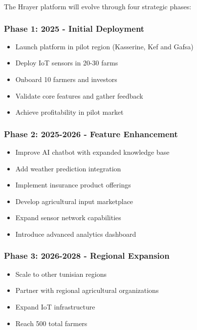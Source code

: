 \documentclass[9pt,twocolumn,twoside]{article}
\begin{document}
The Hrayer platform will evolve through four strategic phases:

\subsubsection{Phase 1: 2025 - Initial Deployment}

\begin{itemize}
  \item Launch platform in pilot region (Kasserine, Kef and Gafsa)
  \item Deploy IoT sensors in 20-30 farms
  \item Onboard 10 farmers and investors
  \item Validate core features and gather feedback
  \item Achieve profitability in pilot market
\end{itemize}

\subsubsection{Phase 2: 2025-2026 - Feature Enhancement}

\begin{itemize}
  \item Improve AI chatbot with expanded knowledge base
  \item Add weather prediction integration
  \item Implement insurance product offerings
  \item Develop agricultural input marketplace
  \item Expand sensor network capabilities
  \item Introduce advanced analytics dashboard
\end{itemize}

\subsubsection{Phase 3: 2026-2028 - Regional Expansion}

\begin{itemize}
  \item Scale to other tunisian regions
  \item Partner with regional agricultural organizations
  \item Expand IoT infrastructure
  \item Reach 500 total farmers
\end{itemize}
\end{document}
